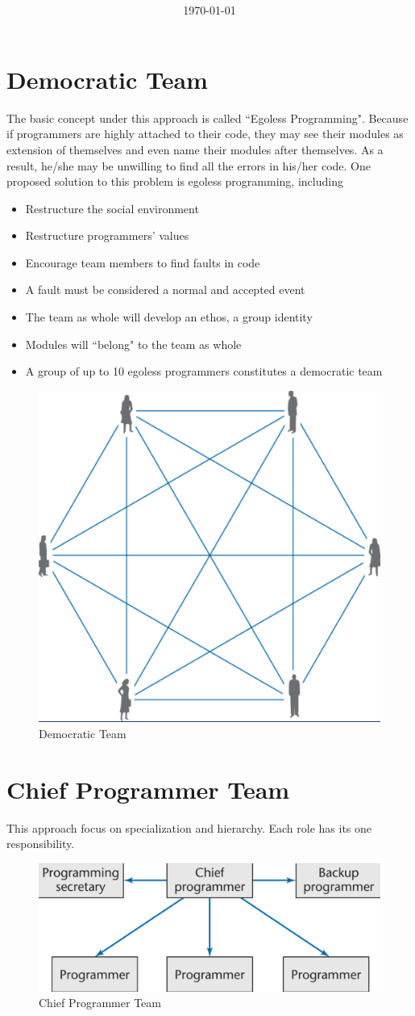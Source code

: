 \documentclass[11pt]{article}
\title{\textbf{\Topic}}
\author{\Name}
\date{\today}
\begin{document}
\maketitle
\noindent\makebox[\linewidth]{\rule[8pt]{5in}{0.5pt}}

\section*{Democratic Team}

The basic concept under this approach is called ``Egoless Programming". Because if programmers are highly attached to their code, they may see their modules as extension of themselves and even name their modules after themselves. As a result, he/she may be unwilling to find all the errors in his/her code. One proposed solution to this problem is egoless programming, including

\begin{itemize}
	\item Restructure the social environment
	\item Restructure programmers' values
	\item Encourage team members to find faults in code
	\item A fault must be considered a normal and accepted event
	\item The team as whole will develop an ethos, a group identity
	\item Modules will ``belong" to the team as whole
	\item A group of up to 10 egoless programmers constitutes a democratic team
\end{itemize}

\begin{figure}[h]
	\centering
	\includegraphics[width=0.4\linewidth]{images/DemocraticTeam.png}
	\caption{Democratic Team}
	\label{fig:DemocraticTeam}
\end{figure}


\section*{Chief Programmer Team}

This approach focus on specialization and hierarchy. Each role has its one responsibility.

\begin{figure}[h]
	\centering
	\includegraphics[width=0.9\linewidth]{images/ChiefProgrammerTeam.png}
	\caption{Chief Programmer Team}
	\label{fig:ChiefProgrammerTeam}
\end{figure}
\end{document}
